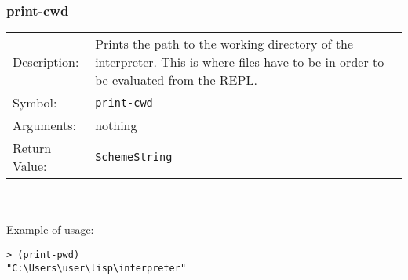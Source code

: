 \documentclass[12pt,a4paper]{scrartcl}
\begin{document}
\subsubsection{print-cwd}
\begin{tabular}{l p{13cm}}
Description: & Prints the path to the working directory of the interpreter. This is where files have to be in order to be evaluated from the REPL. \\
Symbol: & \lstinline{print-cwd}\\
Arguments: & nothing\\
Return Value: & \lstinline{SchemeString}
\end{tabular}
\\
\\
Example of usage:
\begin{lstlisting}
> (print-pwd)
"C:\Users\user\lisp\interpreter"
\end{lstlisting}
\end{document}
